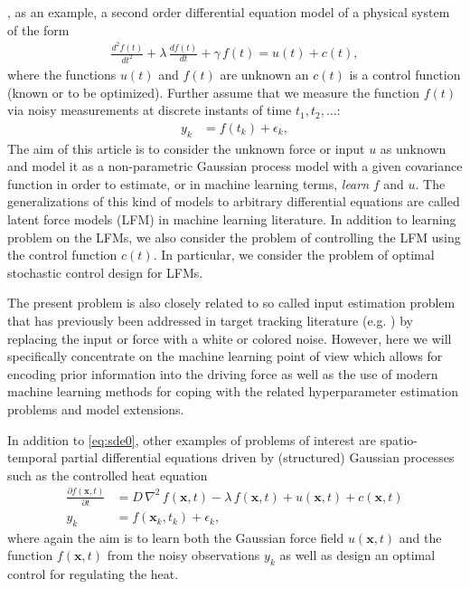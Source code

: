 \documentclass[journal]{IEEEtran}
\begin{document}
, as an example, a second order differential equation model of a physical system of the form
%
\begin{equation}
\begin{split}
  \frac{d^{2}f(t)}{dt^{2}} + \lambda \, \frac{df(t)}{dt} + \gamma \, f(t) = u(t) + c(t),
\end{split}
\label{eq:sde0}
\end{equation}
%
where the functions $u(t)$ and $f(t)$ are unknown an $c(t)$ is a control function (known or to be optimized). Further assume that we measure the function $f(t)$ via noisy measurements at discrete instants of time $t_1,t_2,\ldots$:
%
\begin{equation}
\begin{split}
  y_k &= f(t_k) + \epsilon_k,
\end{split}
\end{equation}
%
The aim of this article is to consider the unknown force or input $u$ as unknown and model it as a non-parametric Gaussian process model \cite{Rasmussen+Williams:2006} with a given covariance function in order to estimate, or in machine learning terms, {\em learn} $f$ and $u$. The generalizations of this kind of models to arbitrary differential equations are called latent force models (LFM) \cite{Alvarez+Luengo+Lawrence:2009,Alvarez:2010,Alvarez+Luengo+Lawrence:2013,Hartikainen+Sarkka:2011,Hartikainen+Seppanen+Sarkka:2012} in machine learning literature. In addition to learning problem on the LFMs, we also consider the problem of controlling the LFM using the control function $c(t)$. In particular, we consider the problem of optimal stochastic control design for LFMs.

The present problem is also closely related to so called input estimation problem that has previously been addressed in target tracking literature (e.g. \cite{Bar-Shalom+Li+Kirubarajan:2001}) by replacing the input or force with a white or colored noise. However, here we will specifically concentrate on the machine learning point of view which allows for encoding prior information into the driving force as well as the use of modern machine learning methods for coping with the related hyperparameter estimation problems and model extensions. 

In addition to \eqref{eq:sde0}, other examples of problems of interest are spatio-temporal partial differential equations driven by (structured) Gaussian processes such as the controlled heat equation
%
\begin{equation}
\begin{split}
  \frac{\partial f(\mathbf{x},t)}{\partial t} &=
  D \, \nabla^2 \, f(\mathbf{x},t) - \lambda \, f(\mathbf{x},t)
  + u(\mathbf{x},t) + c(\mathbf{x},t) \\
  y_k &= f(\mathbf{x}_k,t_k) + \epsilon_k,
\end{split}
\label{eq:spde0}
\end{equation}
%
where again the aim is to learn both the Gaussian force field $u(\mathbf{x},t)$ and the function $f(\mathbf{x},t)$ from
the noisy observations $y_k$ as well as design an optimal control for regulating the heat. 
\end{document}
